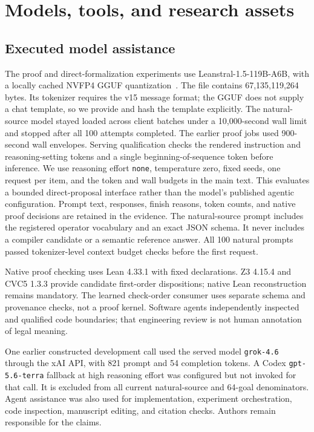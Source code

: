 \section{Models, tools, and research assets}
\label{app:llm}
\subsection{Executed model assistance}
The proof and direct-formalization experiments use Leanstral-1.5-119B-A6B,
with a locally cached NVFP4 GGUF quantization~\citep{mistralai2026leanstral,frosty402026leanstralnvfp4}. The file contains
67,135,119,264 bytes. Its tokenizer requires the v15 message format; the
GGUF does not supply a chat template, so we provide and hash the template
explicitly. The natural-source model stayed loaded across client batches under a
10,000-second wall limit and stopped after all 100 attempts completed. The earlier
proof jobs used 900-second wall envelopes. Serving
qualification checks the rendered instruction and
reasoning-setting tokens and a single beginning-of-sequence token before
inference. We use reasoning effort \texttt{none}, temperature zero, fixed
seeds, one request per item, and the token and wall budgets in the main text.
This evaluates a bounded direct-proposal interface rather than the model's
published agentic configuration. Prompt text, responses, finish reasons,
token counts, and native proof decisions are retained in the evidence.
The natural-source prompt includes the registered operator vocabulary and
an exact JSON schema. It never includes a compiler candidate or a semantic
reference answer. All 100 natural prompts passed tokenizer-level context
budget checks before the first request.

Native proof checking uses Lean 4.33.1 with fixed declarations. Z3 4.15.4
and CVC5 1.3.3 provide candidate first-order dispositions; native Lean
reconstruction remains mandatory. The learned check-order consumer uses
separate schema and provenance checks, not a proof kernel. Software agents
independently inspected and qualified code boundaries; that engineering
review is not human annotation of legal meaning.

One earlier constructed development call used the served model
\texttt{grok-4.6} through the xAI API, with 821 prompt and 54 completion
tokens. A Codex \texttt{gpt-5.6-terra} fallback at high reasoning effort was
configured but not invoked for that call. It is excluded from all current
natural-source and 64-goal denominators. Agent assistance was also used for
implementation, experiment orchestration, code inspection, manuscript
editing, and citation checks. Authors remain responsible for the claims.

